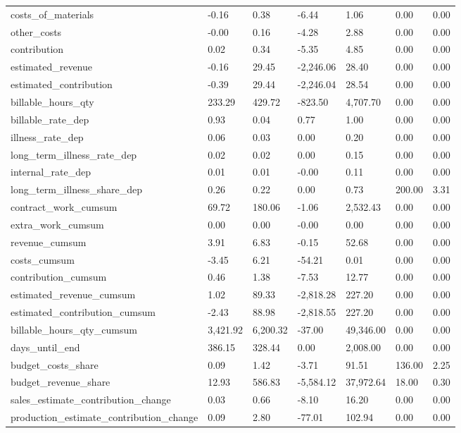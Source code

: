 \begin{landscape}
\begin{longtable}[h!]{lllllll}
costs_of_materials & -0.16 & 0.38 & -6.44 & 1.06 & 0.00 & 0.00 \\
other_costs & -0.00 & 0.16 & -4.28 & 2.88 & 0.00 & 0.00 \\
contribution & 0.02 & 0.34 & -5.35 & 4.85 & 0.00 & 0.00 \\
estimated_revenue & -0.16 & 29.45 & -2,246.06 & 28.40 & 0.00 & 0.00 \\
estimated_contribution & -0.39 & 29.44 & -2,246.04 & 28.54 & 0.00 & 0.00 \\
billable_hours_qty & 233.29 & 429.72 & -823.50 & 4,707.70 & 0.00 & 0.00 \\
billable_rate_dep & 0.93 & 0.04 & 0.77 & 1.00 & 0.00 & 0.00 \\
illness_rate_dep & 0.06 & 0.03 & 0.00 & 0.20 & 0.00 & 0.00 \\
long_term_illness_rate_dep & 0.02 & 0.02 & 0.00 & 0.15 & 0.00 & 0.00 \\
internal_rate_dep & 0.01 & 0.01 & -0.00 & 0.11 & 0.00 & 0.00 \\
long_term_illness_share_dep & 0.26 & 0.22 & 0.00 & 0.73 & 200.00 & 3.31 \\
contract_work_cumsum & 69.72 & 180.06 & -1.06 & 2,532.43 & 0.00 & 0.00 \\
extra_work_cumsum & 0.00 & 0.00 & -0.00 & 0.00 & 0.00 & 0.00 \\
revenue_cumsum & 3.91 & 6.83 & -0.15 & 52.68 & 0.00 & 0.00 \\
costs_cumsum & -3.45 & 6.21 & -54.21 & 0.01 & 0.00 & 0.00 \\
contribution_cumsum & 0.46 & 1.38 & -7.53 & 12.77 & 0.00 & 0.00 \\
estimated_revenue_cumsum & 1.02 & 89.33 & -2,818.28 & 227.20 & 0.00 & 0.00 \\
estimated_contribution_cumsum & -2.43 & 88.98 & -2,818.55 & 227.20 & 0.00 & 0.00 \\
billable_hours_qty_cumsum & 3,421.92 & 6,200.32 & -37.00 & 49,346.00 & 0.00 & 0.00 \\
days_until_end & 386.15 & 328.44 & 0.00 & 2,008.00 & 0.00 & 0.00 \\
budget_costs_share & 0.09 & 1.42 & -3.71 & 91.51 & 136.00 & 2.25 \\
budget_revenue_share & 12.93 & 586.83 & -5,584.12 & 37,972.64 & 18.00 & 0.30 \\
sales_estimate_contribution_change & 0.03 & 0.66 & -8.10 & 16.20 & 0.00 & 0.00 \\
production_estimate_contribution_change & 0.09 & 2.80 & -77.01 & 102.94 & 0.00 & 0.00 \\

\end{longtable}
\end{landscape}
